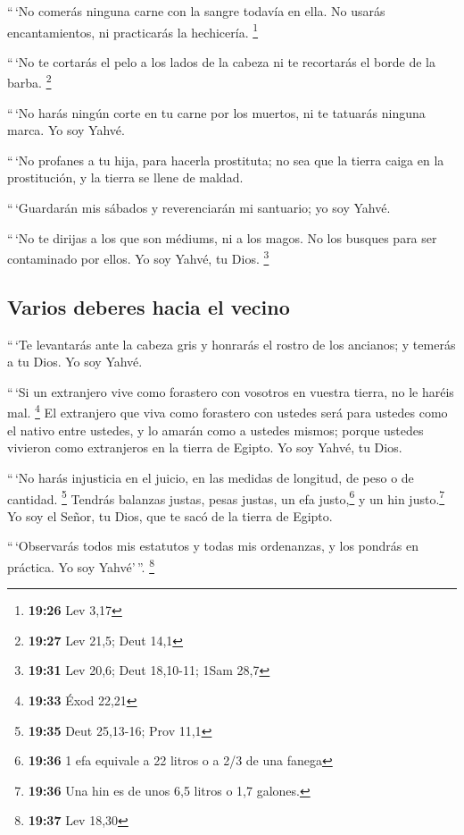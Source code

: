 \begin{paracol}{2}
 ``\,`No comerás ninguna carne con la sangre todavía en
ella. No usarás encantamientos, ni practicarás la hechicería.
\footnote{\textbf{19:26} Lev 3,17}

 ``\,`No te cortarás el pelo a los lados de la cabeza ni
te recortarás el borde de la barba. \footnote{\textbf{19:27} Lev 21,5;
  Deut 14,1}

 ``\,`No harás ningún corte en tu carne por los muertos,
ni te tatuarás ninguna marca. Yo soy Yahvé.

 ``\,`No profanes a tu hija, para hacerla prostituta; no
sea que la tierra caiga en la prostitución, y la tierra se llene de
maldad.

 ``\,`Guardarán mis sábados y reverenciarán mi santuario;
yo soy Yahvé.

 ``\,`No te dirijas a los que son médiums, ni a los
magos. No los busques para ser contaminado por ellos. Yo soy Yahvé, tu
Dios. \footnote{\textbf{19:31} Lev 20,6; Deut 18,10-11; 1Sam 28,7}

\hypertarget{varios-deberes-hacia-el-vecino}{%
\subsection{Varios deberes hacia el
vecino}\label{varios-deberes-hacia-el-vecino}}

 ``\,`Te levantarás ante la cabeza gris y honrarás el
rostro de los ancianos; y temerás a tu Dios. Yo soy Yahvé.

 ``\,`Si un extranjero vive como forastero con vosotros
en vuestra tierra, no le haréis mal. \footnote{\textbf{19:33} Éxod 22,21}
 El extranjero que viva como forastero con ustedes será
para ustedes como el nativo entre ustedes, y lo amarán como a ustedes
mismos; porque ustedes vivieron como extranjeros en la tierra de Egipto.
Yo soy Yahvé, tu Dios.

 ``\,`No harás injusticia en el juicio, en las medidas de
longitud, de peso o de cantidad. \footnote{\textbf{19:35} Deut 25,13-16;
  Prov 11,1}  Tendrás balanzas justas, pesas justas, un
efa justo,\footnote{\textbf{19:36} 1 efa equivale a 22 litros o a 2/3 de
  una fanega} y un hin justo.\footnote{\textbf{19:36} Una hin es de unos
  6,5 litros o 1,7 galones.} Yo soy el Señor, tu Dios, que te sacó de la
tierra de Egipto.

 ``\,`Observarás todos mis estatutos y todas mis
ordenanzas, y los pondrás en práctica. Yo soy Yahvé'\,''. \footnote{\textbf{19:37}
  Lev 18,30}


\end{paracol}
